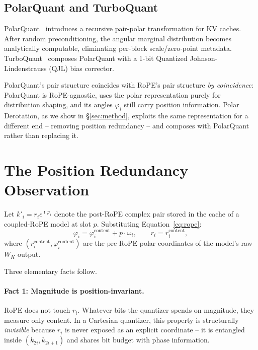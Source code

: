 \documentclass[10pt,twocolumn]{article}
\begin{document}
\subsection{PolarQuant and TurboQuant}

PolarQuant~\cite{polarquant2025} introduces a recursive pair-polar transformation for KV caches. After random preconditioning, the angular marginal distribution becomes analytically computable, eliminating per-block scale/zero-point metadata. TurboQuant~\cite{turboquant2026} composes PolarQuant with a 1-bit Quantized Johnson-Lindenstrauss (QJL) bias corrector.

PolarQuant's pair structure coincides with RoPE's pair structure \emph{by coincidence}: PolarQuant is RoPE-agnostic, uses the polar representation purely for distribution shaping, and its angles $\varphi_i$ still carry position information. Polar Derotation, as we show in \S\ref{sec:method}, exploits the same representation for a different end -- removing position redundancy -- and composes with PolarQuant rather than replacing it.

\section{The Position Redundancy Observation}
\label{sec:observation}

Let $k'_i=r_ie^{\imath\varphi_i}$ denote the post-RoPE complex pair stored in the cache of a coupled-RoPE model at slot $p$. Substituting Equation~\eqref{eq:rope}:
\begin{equation}
  \varphi_i=\varphi^{\text{content}}_i+p\cdot\omega_i,\qquad
  r_i=r^{\text{content}}_i,
  \label{eq:decompose}
\end{equation}
where $(r^{\text{content}}_i,\varphi^{\text{content}}_i)$ are the pre-RoPE polar coordinates of the model's raw $W_K$ output.

Three elementary facts follow.

\paragraph{Fact 1: Magnitude is position-invariant.}
RoPE does not touch $r_i$. Whatever bits the quantizer spends on magnitude, they measure only content. In a Cartesian quantizer, this property is structurally \emph{invisible} because $r_i$ is never exposed as an explicit coordinate -- it is entangled inside $(k_{2i},k_{2i+1})$ and shares bit budget with phase information.
\end{document}
